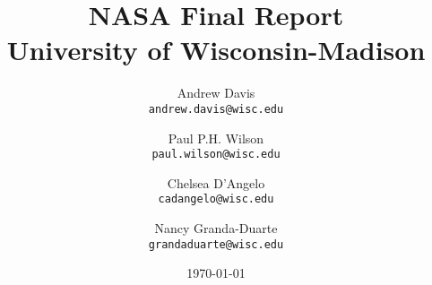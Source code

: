 \documentclass[12pt]{article}
\title{
        {NASA Final Report}\\
        {\large University of Wisconsin-Madison}
}
\author{Andrew Davis\\
       \texttt{andrew.davis@wisc.edu}
       \and
       Paul P.H. Wilson\\
       \texttt{paul.wilson@wisc.edu}
       \and
       Chelsea D'Angelo\\
       \texttt{cadangelo@wisc.edu}
       \and
       Nancy Granda-Duarte\\
       \texttt{grandaduarte@wisc.edu}
       }
\date{\today}
\begin{document}
\maketitle
\newpage
\tableofcontents
\newpage
\listoffigures
\newpage
\listoftables
\newpage











\newpage
\clearpage

{}
\newpage
\clearpage
\appendix




\end{document}
